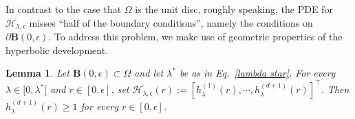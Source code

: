 \documentclass[11pt,a4paper,english,reqno]{amsart}
\theoremstyle{plain}
\newtheorem{lemma}[definition]{Lemma}
\newcommand{\e}{\epsilon}
\newcommand{\1}{\mathbbm{1}}
\newcommand{\B}{\mathbf{B}}
\begin{document}
In contrast to the  case that $\Omega$ is the unit disc, roughly speaking, the PDE for $\overline{\mathcal{H}_{\lambda, \e}}$ misses ``half of the boundary conditions'', namely the conditions on $\partial \B(0, \e)$. To address this problem, we make use of geometric properties of the hyperbolic development.




\begin{lemma}\label{lem: hyperbolic dev}
Let $\B(0, \e) \subset \Omega$ and let $\lambda^\ast$ be as in Eq.~\eqref{lambda star}. For every $\lambda \in [0, \lambda^{*}[$ and $r \in [0, \e]$, set $\overline{\mathcal{H}_{\lambda, \e}}(r) := \left[h_{\lambda}^{(1)}(r), \cdots, h_{\lambda}^{(d+1)}(r)\right]^\top$. Then  $h^{(d+1)}_{\lambda}(r) \geq 1$ for every $r \in [0,\e]$.
\end{lemma}
\end{document}
